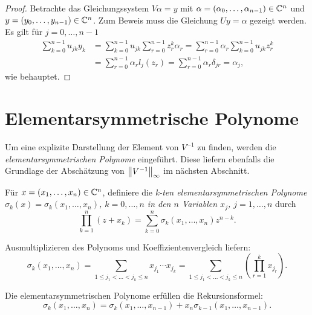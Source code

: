 \begin{proof}
    Betrachte das Gleichungssystem $V \alpha = y$ mit $\alpha = (\alpha_0,
    \dots, \alpha_{n-1}) \in \mathbb{C}^n$ und $y = (y_0, \dots, y_{n-1}) \in \mathbb{C}^n$.
    Zum Beweis muss die Gleichung $U y = \alpha$ gezeigt werden.
    Es gilt für $j = 0, \dots, n-1$
    \[
        \begin{split}
            \sum_{k=0}^{n-1} u_{jk} y_k &= \sum_{k=0}^{n-1} u_{jk} \sum_{r=0}^{n-1} z_r^k \alpha_r = \sum_{r=0}^{n-1} \alpha_r \sum_{k=0}^{n-1} u_{jk} z_r^k\\
                                        &= \sum_{r=0}^{n-1} \alpha_r l_j(z_r) = \sum_{r=0}^{n-1} \alpha_r \delta_{jr} = \alpha_j,
        \end{split}
    \]
    wie behauptet.
\end{proof}

\section{Elementarsymmetrische Polynome}
Um eine explizite Darstellung der Element von $V^{-1}$ zu finden, werden die
\emph{elementarsymmetrischen Polynome} eingeführt.
Diese liefern ebenfalls die Grundlage der Abschätzung von
$\left\lVert V^{-1} \right\rVert_\infty$ im nächsten Abschnitt.

\begin{mydef}
    Für $x = (x_1, \dots, x_{n}) \in \mathbb{C}^n$, definiere die
    \emph{k-ten elementarsymmetrischen Polynome
    $\sigma_{k}(x) = \sigma_{k}(x_1, \dots, x_{n})$, $k = 0, \dots, n$
    in den $n$ Variablen $x_j$, $j = 1, \dots, n$} durch
    \[
        \prod_{k=1}^{n} (z + x_k)
        = \sum_{k=0}^{n} \sigma_{k}(x_1, \dots, x_{n}) z^{n-k}.
    \]
\end{mydef}

\begin{remark}
    Ausmultiplizieren des Polynoms und Koeffizientenvergleich liefern:
    \begin{equation}
        \label{eq:explicit_elementary_symmetric_polynonimals}
        \sigma_{k}(x_1, \dots, x_{n})
        = \sum_{1 \leq j_1 < \dots < j_k \leq n} x_{j_1} \cdots x_{j_k}
        = \sum_{1 \leq j_1 < \dots < j_k \leq n} \left( \prod_{r=1}^k x_{j_r} \right).
    \end{equation}
\end{remark}

\begin{lemma}
    \label{lemma:recursion_elementary_symmetric_polynomials}
    Die elementarsymmetrischen Polynome erfüllen die Rekursionsformel:
    \begin{equation}
        \label{eq:recursion_elementary_symmetric_polynomials}
        \sigma_k (x_1, \dots, x_{n}) = \sigma_k (x_1, \dots, x_{n-1}) + x_{n} \sigma_{k-1} (x_1, \dots, x_{n-1}).
    \end{equation}
\end{lemma}

